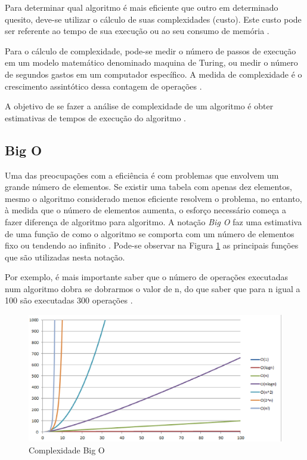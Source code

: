 Para determinar qual algoritmo é mais eficiente que outro em determinado quesito, deve-se utilizar o cálculo de suas complexidades (custo). Este custo pode ser referente ao tempo de sua execução ou ao seu consumo de memória \cite{Albuquerque:2004}.

Para o cálculo de complexidade, pode-se medir o número de passos de execução em um modelo matemático denominado maquina de Turing, ou medir o número de segundos gastos em um computador específico. A medida de complexidade é o crescimento assintótico dessa contagem de operações \cite{Junior:2014}.

A objetivo de se fazer a análise de complexidade de um algoritmo é obter estimativas de tempos de execução do algoritmo \cite{Junior:2014}.

\subsection{Big O}

Uma das preocupações com a eficiência é com problemas que envolvem um grande número de elementos. Se existir uma tabela com apenas dez elementos, mesmo o algoritmo considerado menos eficiente resolvem o problema, no entanto, à medida que o número de elementos aumenta, o esforço necessário começa a fazer diferença de algoritmo para algoritmo. A notação \textit{Big O} faz uma estimativa de uma função de como o algoritmo se comporta com um número de elementos fixo ou tendendo ao infinito \cite{Junior:2014}. Pode-se observar na Figura \ref{grafico_complexidade} as principais funções que são utilizadas nesta notação.

Por exemplo, é mais importante saber que o número de operações executadas num algoritmo dobra se dobrarmos o valor de n, do que saber que para n igual a 100 são executadas 300 operações \cite{Junior:2014}.

\begin{figure}[!h]
	\centering
	\includegraphics[scale=0.5]{figuras/apendices/grafico_complexidade.eps}
	\caption[Complexidade Big O]{Complexidade Big O}
	\label{grafico_complexidade}
\end{figure}


